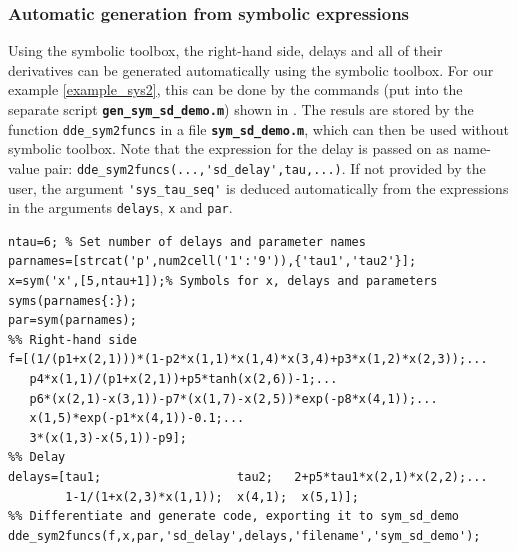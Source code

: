 \documentclass[10pt]{scrartcl}
\newcommand{\file}[1]{\textbf{\texttt{#1}}}
\newcommand{\blist}[1]{\mbox{\lstinline!#1!}}
\begin{document}
\subsubsection{Automatic generation from symbolic expressions}
\label{sec:symbsd}
Using the symbolic toolbox, the right-hand side, delays and all of
their derivatives can be generated automatically using the symbolic
toolbox. For our example \eqref{example_sys2}, this can be done by the
commands (put into the separate script \file{gen\_sym\_sd\_demo.m})
shown in . The resuls are stored by the function
\blist{dde_sym2funcs} in a file \file{sym\_sd\_demo.m}, which can then
be used without symbolic toolbox. Note that the expression for the
delay is passed on as name-value pair: \blist{dde_sym2funcs(...,'sd_delay',tau,...)}. If not provided by the user, the argument \blist{'sys_tau_seq'} is deduced automatically from the expressions in the arguments \blist{delays}, \blist{x} and \blist{par}.

\begin{lstlisting}[float,frame=lines,label=sd_symbolic,caption={Definition for right-hand side, delays and all derivatives of \eqref{example_sys2} using the symbolic toolbox. See \Cref{sd_rhs} for manually provided right-hand sides. See \Cref{sec:funcs} for how to use the generated functions.}]
ntau=6; % Set number of delays and parameter names
parnames=[strcat('p',num2cell('1':'9')),{'tau1','tau2'}];
x=sym('x',[5,ntau+1]);% Symbols for x, delays and parameters
syms(parnames{:});
par=sym(parnames);
%% Right-hand side
f=[(1/(p1+x(2,1)))*(1-p2*x(1,1)*x(1,4)*x(3,4)+p3*x(1,2)*x(2,3));...
   p4*x(1,1)/(p1+x(2,1))+p5*tanh(x(2,6))-1;...
   p6*(x(2,1)-x(3,1))-p7*(x(1,7)-x(2,5))*exp(-p8*x(4,1));...
   x(1,5)*exp(-p1*x(4,1))-0.1;...
   3*(x(1,3)-x(5,1))-p9];
%% Delay
delays=[tau1;                   tau2;   2+p5*tau1*x(2,1)*x(2,2);...
        1-1/(1+x(2,3)*x(1,1));  x(4,1);  x(5,1)];
%% Differentiate and generate code, exporting it to sym_sd_demo
dde_sym2funcs(f,x,par,'sd_delay',delays,'filename','sym_sd_demo');
\end{lstlisting}
\end{document}
